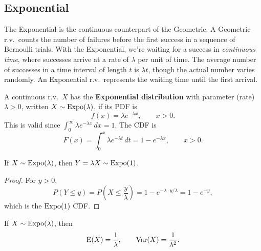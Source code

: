 \subsection{Exponential}

The Exponential is the continuous counterpart of the Geometric. A Geometric r.v.\ counts the number of failures before the first success in a sequence of Bernoulli trials. With the Exponential, we're waiting for a success in \emph{continuous time}, where successes arrive at a rate of $\lambda$ per unit of time. The average number of successes in a time interval of length $t$ is $\lambda t$, though the actual number varies randomly. An Exponential r.v.\ represents the waiting time until the first arrival.

\begin{definition}\label{def:expo}
  A continuous r.v.\ $X$ has the \textbf{Exponential distribution} with parameter (rate) $\lambda > 0$, written $X \sim \operatorname{Expo}(\lambda)$, if its PDF is
  \[
    f(x) = \lambda e^{-\lambda x}, \qquad x > 0.
  \]
  This is valid since $\int_{0}^{\infty} \lambda e^{-\lambda x}\,dx = 1$. The CDF is
  \[
    F(x) = \int_{0}^{x} \lambda e^{-\lambda t}\,dt = 1 - e^{-\lambda x}, \qquad x > 0.
  \]
\end{definition}

\begin{proposition}\label{prop:exposcale}
  If $X \sim \operatorname{Expo}(\lambda)$, then $Y = \lambda X \sim \operatorname{Expo}(1)$.
\end{proposition}

\begin{proof}
  For $y > 0$,
  \[
    P(Y \le y) = P\!\left(X \le \frac{y}{\lambda}\right) = 1 - e^{-\lambda \cdot y/\lambda} = 1 - e^{-y},
  \]
  which is the $\operatorname{Expo}(1)$ CDF.
\end{proof}

\begin{theorem}\label{thm:expoEV}
  If $X \sim \operatorname{Expo}(\lambda)$, then
  \[
    \operatorname{E}(X) = \frac{1}{\lambda},
    \qquad
    \operatorname{Var}(X) = \frac{1}{\lambda^{2}}.
  \]
\end{theorem}

